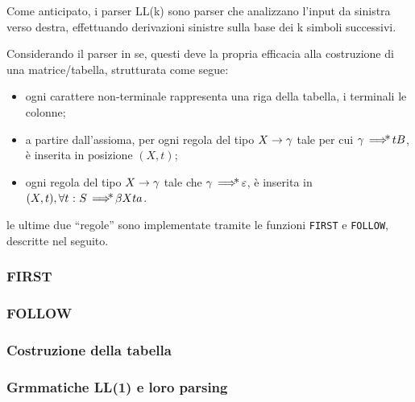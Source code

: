 \documentclass{subfiles}
\begin{document}
Come anticipato, i parser LL(k) sono parser che analizzano l'input da sinistra verso destra,
effettuando derivazioni sinistre sulla base dei k simboli successivi.

Considerando il parser in se, questi deve la propria efficacia alla costruzione di una matrice/tabella, strutturata come segue:
\begin{itemize}
    \item ogni carattere non-terminale rappresenta una riga della tabella, i terminali le colonne;
    \item a partire dall'assioma, per ogni regola del tipo \(\Grammar{X}{\gamma}\) tale per cui \(\gamma \operatorname{\implies\hspace{-7.5pt}*} tB\),
          è inserita in posizione \((X, t)\);

    \item ogni regola del tipo \(\Grammar{X}{\gamma}\) tale che \(\gamma \operatorname{\implies\hspace{-7.5pt}*} \varepsilon\),
          è inserita in \((X, t), \forall t \operatorname{\, : \,} S \operatorname{\implies\hspace{-7.5pt}*} \beta X t a\).
\end{itemize}

\begin{Note*}
    le ultime due ``regole'' sono implementate tramite le funzioni \lstinline{FIRST} e \lstinline{FOLLOW}, descritte nel seguito.
\end{Note*}

\subsubsection{FIRST}


\subsubsection{FOLLOW}

\clearpage
\subsubsection{Costruzione della tabella}


\subsubsection{Grmmatiche LL(1) e loro parsing}

\end{document}
